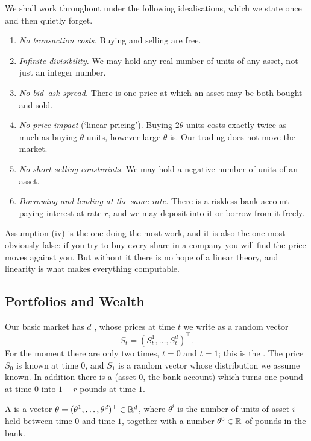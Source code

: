 \documentclass[a4paper]{scrartcl}
\begin{document}
We shall work throughout under the following idealisations, which we state once and then quietly forget.

\begin{enumerate}[label=(\roman*)]
	\item \emph{No transaction costs.} Buying and selling are free.
	\item \emph{Infinite divisibility.} We may hold any real number of units of any asset, not just an integer number.
	\item \emph{No bid--ask spread.} There is one price at which an asset may be both bought and sold.
	\item \emph{No price impact} (`linear pricing'). Buying $2\theta$ units costs exactly twice as much as buying $\theta$ units, however large $\theta$ is. Our trading does not move the market.
	\item \emph{No short-selling constraints.} We may hold a negative number of units of an asset.
	\item \emph{Borrowing and lending at the same rate.} There is a riskless bank account paying interest at rate $r$, and we may deposit into it or borrow from it freely.
\end{enumerate}

Assumption (iv) is the one doing the most work, and it is also the one most obviously false: if you try to buy every share in a company you will find the price moves against you. But without it there is no hope of a linear theory, and linearity is what makes everything computable.

\subsection{Portfolios and Wealth}

Our basic market has $d$ , whose prices at time $t$ we write as a random vector
$$
S_t = (S_t^1, \dots, S_t^d)^\top.
$$
For the moment there are only two times, $t = 0$ and $t = 1$; this is the . The price $S_0$ is known at time $0$, and $S_1$ is a random vector whose distribution we assume known. In addition there is a  (asset $0$, the bank account) which turns one pound at time $0$ into $1 + r$ pounds at time $1$.

\begin{definition}[Portfolio]
	A  is a vector $\theta = (\theta^1, \dots, \theta^d)^\top \in \mathbb{R}^d$, where $\theta^i$ is the number of units of asset $i$ held between time $0$ and time $1$, together with a number $\theta^0 \in \mathbb{R}$ of pounds in the bank.
\end{definition}
\end{document}
